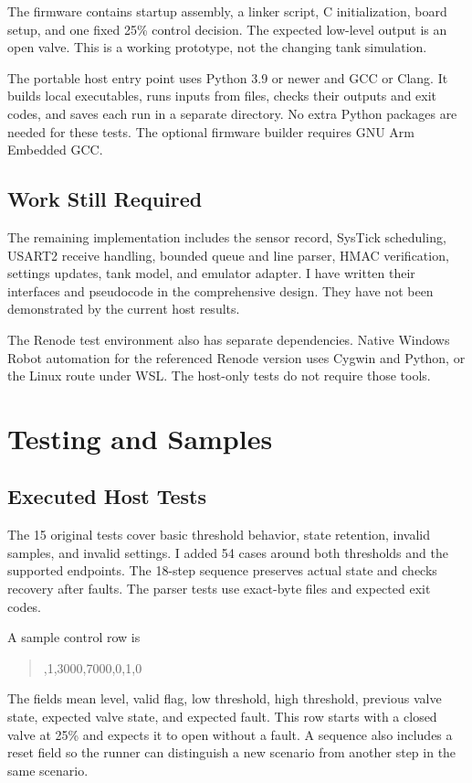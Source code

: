\documentclass[conference]{IEEEtran}
\begin{document}
The firmware contains startup assembly, a linker script, C initialization, board setup, and one fixed 25\% control decision. The expected low-level output is an open valve. This is a working prototype, not the changing tank simulation.

The portable host entry point uses Python 3.9 or newer and GCC or Clang. It builds local executables, runs inputs from files, checks their outputs and exit codes, and saves each run in a separate directory. No extra Python packages are needed for these tests. The optional firmware builder requires GNU Arm Embedded GCC.

\subsection{Work Still Required}
The remaining implementation includes the sensor record, SysTick scheduling, USART2 receive handling, bounded queue and line parser, HMAC verification, settings updates, tank model, and emulator adapter. I have written their interfaces and pseudocode in the comprehensive design. They have not been demonstrated by the current host results.

The Renode test environment also has separate dependencies. Native Windows Robot automation for the referenced Renode version uses Cygwin and Python, or the Linux route under WSL. The host-only tests do not require those tools.

\section{Testing and Samples}
\subsection{Executed Host Tests}
The 15 original tests cover basic threshold behavior, state retention, invalid samples, and invalid settings. I added 54 cases around both thresholds and the supported endpoints. The 18-step sequence preserves actual state and checks recovery after faults. The parser tests use exact-byte files and expected exit codes.

A sample control row is
\begin{quote}\small{},1,3000,7000,0,1,0
\end{quote}
The fields mean level, valid flag, low threshold, high threshold, previous valve state, expected valve state, and expected fault. This row starts with a closed valve at 25\% and expects it to open without a fault. A sequence also includes a reset field so the runner can distinguish a new scenario from another step in the same scenario.
\end{document}
